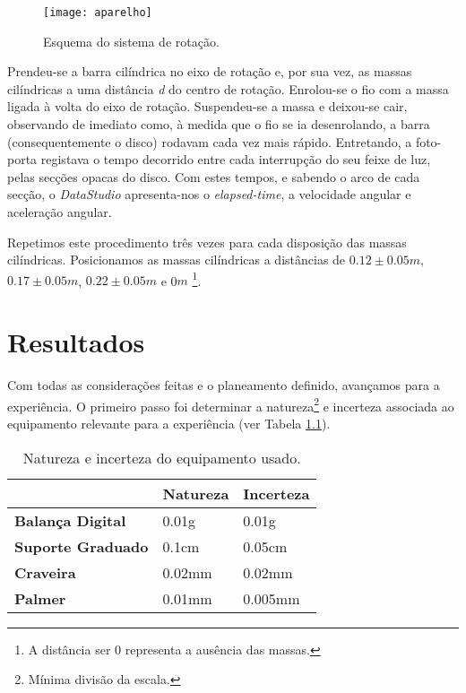\documentclass[11pt]{report}
\begin{document}
\begin{figure} [h]
\center
\texttt{[image: aparelho]}
\caption{Esquema do sistema de rotação.\label{fig:figura4}}
\end{figure}

Prendeu-se a barra cilíndrica no eixo de rotação e, por sua vez, as massas cilíndricas a uma distância \textit{d} do centro de rotação. Enrolou-se o fio com a massa ligada à volta do eixo de rotação. Suspendeu-se a massa e deixou-se cair, observando de imediato como, à medida que o fio se ia desenrolando, a barra (consequentemente o disco) rodavam cada vez mais rápido. Entretando, a foto-porta registava o tempo decorrido entre cada interrupção do seu feixe de luz, pelas secções opacas do disco. Com estes tempos, e sabendo o arco de cada secção, o \textit{DataStudio} apresenta-nos o \textit{elapsed-time}, a velocidade angular e aceleração angular.

Repetimos este procedimento três vezes para cada disposição das massas cilíndricas.
Posicionamos as massas cilíndricas a distâncias de $0.12\pm0.05 m$, $0.17\pm0.05 m$, $0.22\pm0.05 m$ e 0$m$ \footnote{A distância ser 0 representa a ausência das massas.}. 
\chapter{Resultados}

Com todas as considerações feitas e o planeamento definido, avançamos para a experiência.
O primeiro passo foi determinar a natureza\footnote{Mínima divisão da escala.} e incerteza associada ao equipamento relevante para a experiência (ver Tabela \ref{tabela:5.1}).

\begin{table}[h]
  \centering
    \begin{tabular}{|p{40mm}|p{4.215em}|p{4.215em}|}
    \toprule
    \multicolumn{1}{|r|}{} & \cellcolor[rgb]{ 0,  .69,  .941}\textbf{Natureza} & \cellcolor[rgb]{ 0,  .69,  .941}\textbf{Incerteza} \\
    \midrule
    \rowcolor[rgb]{ 1,  .753,  0} \textbf{Balança Digital} & \cellcolor[rgb]{ 1,  1,  1}0.01g & \cellcolor[rgb]{ 1,  1,  1}0.01g \\
    \midrule
    \rowcolor[rgb]{ 1,  .753,  0} \textbf{Suporte Graduado} & \cellcolor[rgb]{ 1,  1,  1}0.1cm & \cellcolor[rgb]{ 1,  1,  1}0.05cm \\
    \midrule
    \rowcolor[rgb]{ 1,  .753,  0} \textbf{Craveira} & \cellcolor[rgb]{ 1,  1,  1}0.02mm & \cellcolor[rgb]{ 1,  1,  1}0.02mm \\
    \midrule
    \rowcolor[rgb]{ 1,  .753,  0} \textbf{Palmer} & \cellcolor[rgb]{ 1,  1,  1}0.01mm & \cellcolor[rgb]{ 1,  1,  1}0.005mm \\
    \bottomrule
    \end{tabular}%
  \label{tab:addlabel}%
    \caption{Natureza e incerteza do equipamento usado. \label{tabela:5.1}}
\end{table}%
\end{document}
